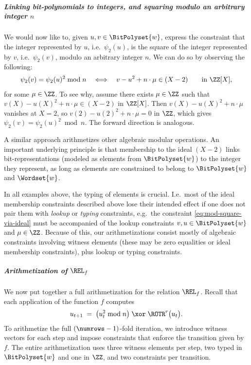 \subparagraph{Linking bit-polynomials to integers, and squaring modulo an arbitrary integer $n$}  We would now like to, given $u,v\in\BitPolyset{w}$, express the constraint that the integer represented by $u$, i.e.\ $\psi_2(u)$, is the square of the integer represented by $v$, i.e.\ $\psi_2(v)$, modulo an arbitrary integer $n$. We can do so by observing the following: 
%
\begin{equation}\label{eq:mod-square-via-ideal}
\psi_2(v) = \psi_2(u)^2 \bmod n \quad \Longleftrightarrow \quad v-u^2 + n\cdot \mu \in (X-2) \qquad\text{in }\ZZ[X],
\end{equation}
for some $\mu \in \ZZ$.  To see why, assume there exists $\mu\in \ZZ$ such that  $v(X)-u(X)^2 + n\cdot \mu \in (X-2)$ in $\ZZ[X]$. Then $v(X)-u(X)^2 + n\cdot \mu$ vanishes at $X=2$, so $v(2)-u(2)^2 + n\cdot \mu = 0$ in $\ZZ$, which gives $\psi_2(v) = \psi_2(u)^2 \bmod n$. The forward direction is analogous.

A similar approach arithmetizes other algebraic modular operations.  An important underlying principle is that membership to the ideal $(X-2)$ links bit-representations (modeled as elements from $\BitPolyset{w}$) to the integer they represent, as long as elements are constrained to belong to $\BitPolyset{w}$ and $\Wordset{w}$. 



\begin{remark}\label{rem:correct_domain}
 In all examples above, the typing  of elements is crucial. I.e.\ most of the ideal membership constraints described above lose their intended effect if one does not pair them with \emph{lookup} or \emph{typing} constraints, e.g.\ the constraint \eqref{eq:mod-square-via-ideal} %
 must be accompanied of the lookup constraints $v,u\in \BitPolyset{w}$ and $\mu\in \ZZ$. Because of this, our arithmetizations consist mostly of algebraic constraints involving witness elements (these  may be zero equalities or ideal membership constraints), plus lookup or typing constraints.
\end{remark}


\subparagraph{Arithmetization of $\REL_f$} We now put together a full arithmetization for the relation $\REL_f$.
Recall that each application of the function $f$ computes
\[
  u_{t+1} \;=\; \bigl(u_{t}^2 \bmod n \bigr)\;\xor\; \ROTR^r\bigl(u_{t}\bigr).
\]
To arithmetize the full $(\numrows-1)$-fold iteration, we introduce witness vectors for each step 
and impose constraints that enforce the transition given by $f$.
The entire arithmetization uses three witness elements per step, two typed in $\BitPolyset{w}$ and one in $\ZZ$, and
two constraints  per transition. 


